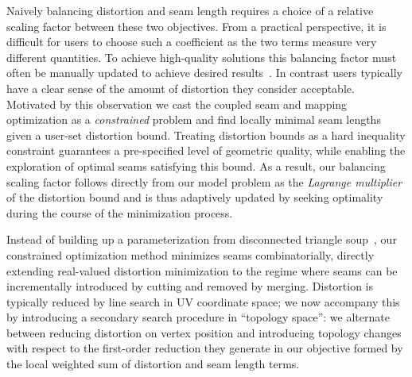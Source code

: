 Naively balancing distortion and seam length requires a choice of a relative scaling factor between these two objectives.  From a practical perspective, it is difficult for users to choose such a coefficient as the two terms measure very different quantities. %
To achieve high-quality solutions this balancing factor must often be %
manually updated  to achieve desired results~\cite{Poranne2017Autocuts}. In contrast users typically have a clear sense of the amount of distortion they consider acceptable. Motivated by this observation we cast the coupled seam and mapping optimization as a \emph{constrained} problem and find locally minimal seam lengths given a user-set distortion bound. Treating distortion bounds as a hard inequality constraint guarantees a pre-specified level of geometric quality, while enabling the exploration of optimal seams satisfying this bound. %
As a result, our balancing scaling factor follows directly from our model problem as the \emph{Lagrange multiplier} of the distortion bound and is thus adaptively updated by seeking optimality during the course of the minimization process.  %

%
%
Instead of building up a parameterization from disconnected triangle soup~\cite{Poranne2017Autocuts}, our constrained optimization method minimizes seams combinatorially, directly extending real-valued distortion minimization to the regime where seams can be incrementally introduced by cutting and removed by merging. 
Distortion is typically reduced by line search in UV coordinate space; we now accompany this by introducing a secondary search procedure in ``topology space'': we alternate between reducing distortion on vertex position and introducing topology changes with respect to the first-order reduction they generate in our objective formed by the local weighted sum of distortion and seam length terms. %


